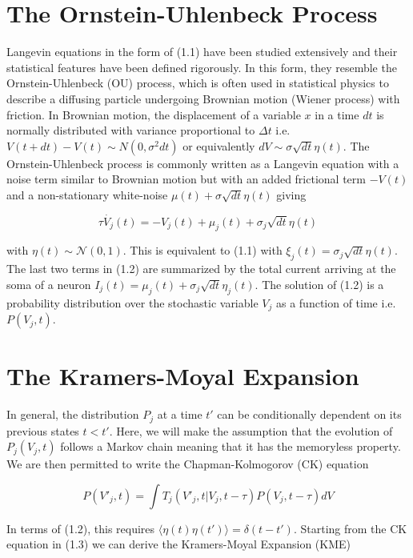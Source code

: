 \documentclass{ucetd}
\begin{document}
\section{The Ornstein-Uhlenbeck Process}

Langevin equations in the form of (1.1) have been studied extensively and their statistical features have been defined rigorously. In this form, they resemble the Ornstein-Uhlenbeck (OU) process, which is often used in statistical physics to describe a diffusing particle undergoing Brownian motion (Wiener process) with friction. In Brownian motion, the displacement of a variable $x$ in a time $dt$ is normally distributed with variance proportional to $\Delta t$ i.e. $V(t+dt) - V(t) \sim N(0, \sigma^{2}dt)$ or equivalently $dV \sim \sigma\sqrt{dt}\eta(t)$. The Ornstein-Uhlenbeck process is commonly written as a Langevin equation with a noise term similar to Brownian motion but with an added frictional term $-V(t)$ and a non-stationary white-noise $\mu(t) + \sigma\sqrt{dt}\eta(t)$ giving


\begin{equation}
\tau\dot{V_{j}}(t) = -V_{j}(t) + \mu_{j}(t) + \sigma_{j}\sqrt{dt}\eta(t)
\end{equation}

with $\eta(t) \sim \mathcal{N}(0,1)$. This is equivalent to (1.1) with $\xi_{j}(t) = \sigma_{j}\sqrt{dt}\eta(t)$. The last two terms in (1.2) are summarized by the total current arriving at the soma of a neuron $I_{j}(t) = \mu_{j}(t) + \sigma_{j}\sqrt{dt}\eta_{j}(t)$. The solution of (1.2) is a probability distribution over the stochastic variable $V_{j}$ as a function of time i.e. $P(V_{j},t)$. 

\section{The Kramers-Moyal Expansion}

In general, the distribution $P_{j}$ at a time $t'$ can be conditionally dependent on its previous states $t < t'$. Here, we will make the assumption that the evolution of $P_{j}(V_{j},t)$ follows a Markov chain meaning that it has the memoryless property. We are then permitted to write the Chapman-Kolmogorov (CK) equation

\begin{equation}
P(V'_{j}, t) = \int T_{j}(V'_{j}, t | V_{j}, t-\tau)P(V_{j}, t-\tau)dV
\end{equation} 

In terms of (1.2), this requires $\langle\eta(t)\eta(t')\rangle = \delta(t-t')$. Starting from the CK equation in (1.3) we can derive the Kramers-Moyal Expansion (KME) 
\end{document}

